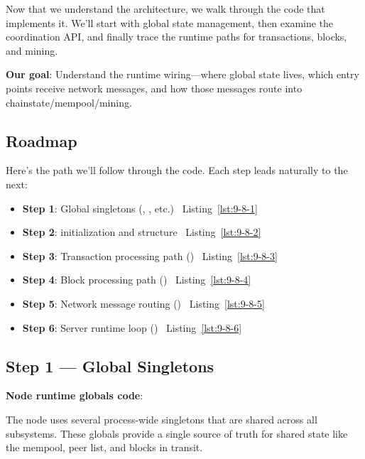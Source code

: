 Now that we understand the architecture, we walk through the code that implements it. We'll start with global state management, then examine the coordination API, and finally trace the runtime paths for transactions, blocks, and mining.

\textbf{Our goal}: Understand the runtime wiring---where global state lives, which entry points receive network messages, and how those messages route into chainstate/mempool/mining.

\subsection{Roadmap}
\label{sec:ch09-8-roadmap}

Here's the path we'll follow through the code. Each step leads naturally to the next:

\begin{itemize}
  \item \textbf{Step 1}: Global singletons (, , etc.) \textrightarrow\ Listing~\ref{lst:9-8-1}
  \item \textbf{Step 2}:  initialization and structure \textrightarrow\ Listing~\ref{lst:9-8-2}
  \item \textbf{Step 3}: Transaction processing path () \textrightarrow\ Listing~\ref{lst:9-8-3}
  \item \textbf{Step 4}: Block processing path () \textrightarrow\ Listing~\ref{lst:9-8-4}
  \item \textbf{Step 5}: Network message routing () \textrightarrow\ Listing~\ref{lst:9-8-5}
  \item \textbf{Step 6}: Server runtime loop () \textrightarrow\ Listing~\ref{lst:9-8-6}
\end{itemize}

\subsection{Step 1 --- Global Singletons}
\label{sec:ch09-8-step1}

\textbf{Node runtime globals code}: 

The node uses several process-wide singletons that are shared across all subsystems. These globals provide a single source of truth for shared state like the mempool, peer list, and blocks in transit.

